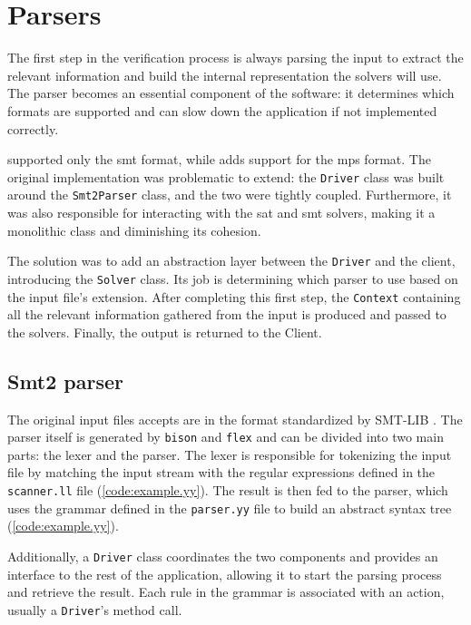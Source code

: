 
\section{Parsers}

The first step in the verification process is always parsing the input to extract the relevant information and build the internal representation the solvers will use.
The parser becomes an essential component of the software: it determines which formats are supported and can slow down the application if not implemented correctly.

\dlinearfour supported only the \gls{smt} format, while \dlinear adds support for the \gls{mps} format.
The original implementation was problematic to extend: the \texttt{Driver} class was built around the \texttt{Smt2Parser} class, and the two were tightly coupled.
Furthermore, it was also responsible for interacting with the \gls{sat} and \gls{smt} solvers, making it a monolithic class and diminishing its cohesion.

The solution was to add an abstraction layer between the \texttt{Driver} and the client, introducing the \texttt{Solver} class.
Its job is determining which parser to use based on the input file's extension.
After completing this first step, the \texttt{Context} containing all the relevant information gathered from the input is produced and passed to the solvers.
Finally, the output is returned to the Client.

\subsection*{Smt2 parser}

The original input files \dlinear accepts are in the format standardized by SMT-LIB \cite{docs:smtlib}.
The parser itself is generated by \texttt{bison} and \texttt{flex} and can be divided into two main parts: the lexer and the parser.
The lexer is responsible for tokenizing the input file by matching the input stream with the regular expressions defined in the \texttt{scanner.ll} file (\autoref{code:example.yy}).
The result is then fed to the parser, which uses the grammar defined in the \texttt{parser.yy} file to build an abstract syntax tree (\autoref{code:example.yy}).

Additionally, a \texttt{Driver} class coordinates the two components and provides an interface to the rest of the application, allowing it to start the parsing process and retrieve the result.
Each rule in the grammar is associated with an action, usually a \texttt{Driver}'s method call.

